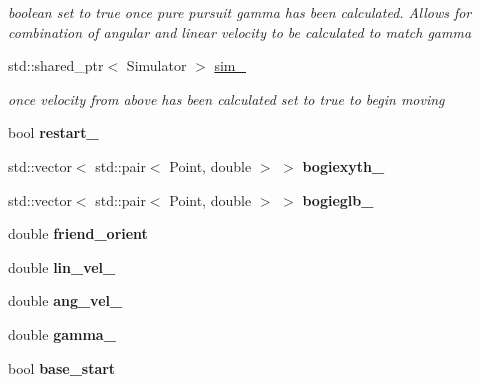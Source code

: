 \begin{DoxyCompactItemize}
\begin{DoxyCompactList}\small\item\em boolean set to true once pure pursuit gamma has been calculated. Allows for combination of angular and linear velocity to be calculated to match gamma \end{DoxyCompactList}\item 
\mbox{\label{classControl_acbae7d5fe1e846d3e18bde050b7d47eb}} 
std\+::shared\+\_\+ptr$<$ Simulator $>$ \hyperlink{classControl_acbae7d5fe1e846d3e18bde050b7d47eb}{sim\+\_\+}
\begin{DoxyCompactList}\small\item\em once velocity from above has been calculated set to true to begin moving \end{DoxyCompactList}\item 
\mbox{\label{classControl_af8f3f9e1cdc0eef72c8909fb4fdbe625}} 
bool {\bfseries restart\+\_\+}
\item 
\mbox{\label{classControl_a1f1ff7bfd8ae9d904b0129a7aa5d9423}} 
std\+::vector$<$ std\+::pair$<$ Point, double $>$ $>$ {\bfseries bogiexyth\+\_\+}
\item 
\mbox{\label{classControl_a619045e6557f64b899094072d91cb81c}} 
std\+::vector$<$ std\+::pair$<$ Point, double $>$ $>$ {\bfseries bogieglb\+\_\+}
\item 
\mbox{\label{classControl_ab08189ab85b36a617ca92fe0d5c883f9}} 
double {\bfseries friend\+\_\+orient}
\item 
\mbox{\label{classControl_ae0c72e0e6f9a65c47e465919d933f591}} 
double {\bfseries lin\+\_\+vel\+\_\+}
\item 
\mbox{\label{classControl_aad6d7018e96b5fa63eaa408efbe27a5d}} 
double {\bfseries ang\+\_\+vel\+\_\+}
\item 
\mbox{\label{classControl_a24a6dc661cdf3860042fe413da5e0263}} 
double {\bfseries gamma\+\_\+}
\item 
\mbox{\label{classControl_a90725edeeaf742703b571edb950be39c}} 
bool {\bfseries base\+\_\+start}
\item 

\end{DoxyCompactItemize}
